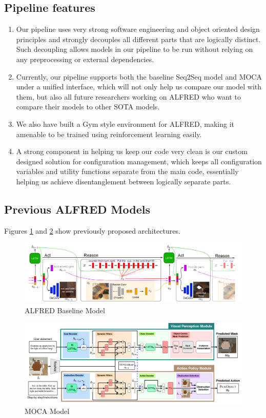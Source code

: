 \documentclass[11pt,a4paper]{article}
\begin{document}
\subsection{Pipeline features}
\label{app:code}

\begin{enumerate}
    \item Our pipeline uses very strong software engineering and object oriented design principles and strongly decouples all different parts that are logically distinct. Such decoupling allows models in our pipeline to be run without relying on any preprocessing or external dependencies.
    \item Currently, our pipeline supports both the baseline Seq2Seq model and MOCA under a unified interface, which will not only help us compare our model with them, but also all future researchers working on ALFRED who want to compare their models to other SOTA models.
    \item We also have built a Gym style \cite{brockman2016openai} environment for ALFRED, making it amenable to be trained using reinforcement learning easily.
    \item A strong component in helping us keep our code very clean is our custom designed solution for configuration management, which keeps all configuration variables and utility functions separate from the main code, essentially helping us achieve disentanglement between logically separate parts.
\end{enumerate}

\subsection{Previous ALFRED Models}

Figures \ref{fig:alfred_model} and \ref{fig:moca_model} show previously proposed architectures.

\begin{figure}
    \centering
    \includegraphics[scale=0.75]{figures/alfred_model.png}
    \caption{ALFRED Baseline Model \cite{shridhar2020alfred}}
    \label{fig:alfred_model}
\end{figure}

\begin{figure}
    \centering
    \includegraphics[scale=0.75]{figures/moca_model.png}
    \caption{MOCA Model \cite{singh2020moca}}
    \label{fig:moca_model}
\end{figure}
\end{document}

